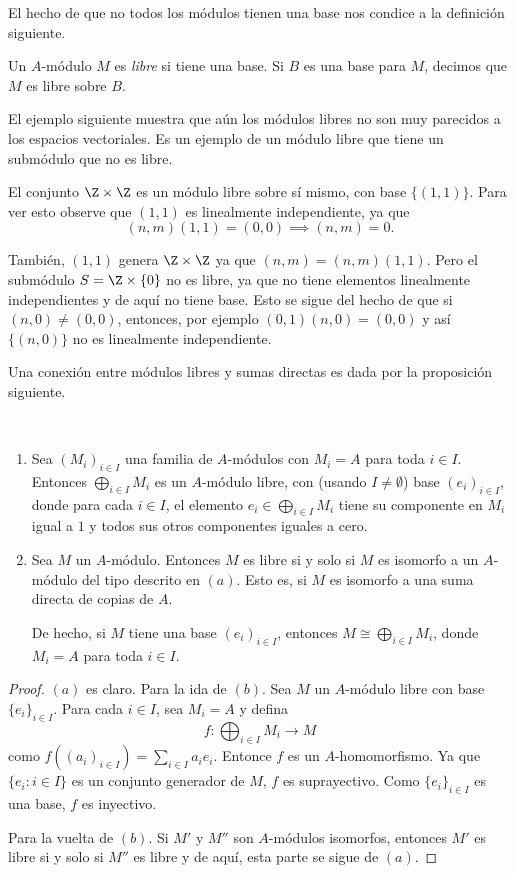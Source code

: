 El hecho de que no todos los módulos tienen una base nos condice a la definición siguiente.

\begin{definition}
  Un $A$-módulo $M$ es \emph{libre} si tiene una base. Si $B$ es una base para $M$, decimos que $M$ es libre sobre $B$.
\end{definition}

El ejemplo siguiente muestra que aún los módulos libres no son muy parecidos a los espacios vectoriales. Es un ejemplo de un módulo libre que tiene un submódulo que no es libre.

\begin{example}
  El conjunto $\Z \times \Z$ es un módulo libre sobre sí mismo, con base $\{(1,1)\}$. Para ver esto observe que $(1,1)$ es linealmente independiente, ya que
  \[
    (n,m)(1,1) = (0,0) \implies (n,m) = 0.
  \]

  También, $(1,1)$ genera $\Z \times \Z$ ya que $(n,m) = (n,m)(1,1)$. Pero el submódulo $S = \Z \times \{0\}$ no es libre, ya que no tiene elementos linealmente independientes y de aquí no tiene base. Esto se sigue del hecho de que si $(n,0) \neq (0,0)$, entonces, por ejemplo $(0,1)(n,0) = (0,0)$ y así $\{(n,0)\}$ no es linealmente independiente.
\end{example}

Una conexión entre módulos libres y sumas directas es dada por la proposición siguiente.

\begin{proposition}~
  \begin{enumerate}
    \item Sea $(M_i)_{i \in I}$ una familia de $A$-módulos con $M_i = A$ para toda $i \in I$. Entonces $\bigoplus_{i\in I} M_i$ es un $A$-módulo libre, con (usando $I \neq \emptyset$) base $(e_i)_{i \in I}$, donde para cada $i \in I$, el elemento $e_i \in \bigoplus_{i\in I} M_i$ tiene su componente en $M_i$ igual a $1$ y todos sus otros componentes iguales a cero.
    
    \item Sea $M$ un $A$-módulo. Entonces $M$ es libre si y solo si $M$ es isomorfo a un $A$-módulo del tipo descrito en $(a)$. Esto es, si $M$ es isomorfo a una suma directa de copias de $A$.
    
    De hecho, si $M$ tiene una base $(e_i)_{i \in I}$, entonces $M \cong \bigoplus_{i\in I} M_i$, donde $M_i = A$ para toda $i \in I$.
  \end{enumerate}
\end{proposition}
\begin{proof}
  $(a)$ es claro. Para la ida de $(b)$. Sea $M$ un $A$-módulo libre con base $\{e_i\}_{i \in I}$. Para cada $i \in I$, sea $M_i =A$ y defina
    \[
      f\colon \bigoplus_{i \in I} M_i \to M
    \]
    como $f((a_i)_{i\in I}) = \sum_{i\in I} a_i e_i$. Entonce $f$ es un $A$-homomorfismo. Ya que $\{e_i : i \in I\}$ es un conjunto generador de $M$, $f$ es suprayectivo. Como $\{e_i\}_{i\in I}$ es una base, $f$ es inyectivo.

    Para la vuelta de $(b)$. Si $M'$ y $M''$ son $A$-módulos isomorfos, entonces $M'$ es libre si y solo si $M''$ es libre y de aquí, esta parte se sigue de $(a)$.
\end{proof}

